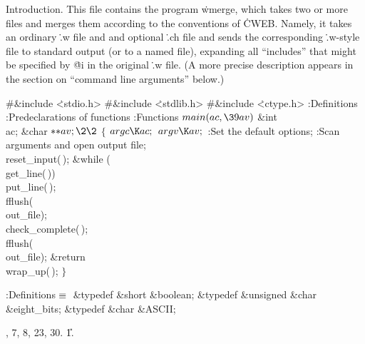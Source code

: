 

\def\9#1{} %


Introduction.  This file contains the program \.{wmerge},
which takes two or more files and merges them according
to the conventions of \.{CWEB}. Namely, it takes an ordinary \.{.w}
file and and optional \.{.ch} file and sends the corresponding
\.{.w}-style file to standard output (or to a named file),
expanding all ``includes''
that might be specified by \.{@i} in the original \.{.w} file.
(A more precise description appears in the section on ``command line
arguments'' below.)

\Y\B\8\#\&{include} \.{<stdio.h>}\6
\8\#\&{include} \.{<stdlib.h>}\6
\8\#\&{include} \.{<ctype.h>}\6
:Definitions\X\6
:Predeclarations of functions\X\6
:Functions\X\7
${}\\{main}(\\{ac},\39\\{av}){}$\1\1\6
\&{int} \\{ac};\6
\&{char} ${}{*}{*}\\{av};\2\2{}$\6
${}\{{}$\1\6
${}\\{argc}\K\\{ac};{}$\6
${}\\{argv}\K\\{av};{}$\6
:Set the default options\X;\6
:Scan arguments and open output file\X;\6
\\{reset\_input}(\,);\6
\&{while} (\\{get\_line}(\,))\1\5
\\{put\_line}(\,);\2\6
\\{fflush}(\\{out\_file});\6
\\{check\_complete}(\,);\6
\\{fflush}(\\{out\_file});\6
\&{return} \\{wrap\_up}(\,);\6
\4${}\}{}$\2\par
\fi

\B{}:Definitions\X${}\equiv{}$\6
\&{typedef} \&{short} \&{boolean};\6
\&{typedef} \&{unsigned} \&{char} \&{eight\_bits};\6
\&{typedef} \&{char} \&{ASCII};\par
{}, 7, 8, 23, 30.
\U1.\fi

